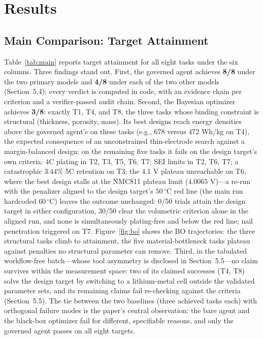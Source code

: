 \section{Results}
\label{sec:results}

\subsection{Main Comparison: Target Attainment}

Table~\ref{tab:main} reports target attainment for all eight tasks under
the six columns. Three findings stand out. First, the governed
agent achieves \textbf{8/8} under the two primary models and \textbf{4/8}
under each of the two other models (Section~5.4); every verdict is
computed in code, with an evidence chain per criterion and a verifier-passed
audit chain. Second,
the Bayesian optimizer achieves \textbf{3/8}: exactly T1, T4, and T8, the
three tasks whose binding constraint is structural (thickness, porosity,
mass). Its best designs reach energy densities above the governed agent's on
these tasks (e.g., 678 versus 472 Wh/kg on T4), the expected consequence of
an unconstrained thin-electrode search against a margin-balanced design; on
the remaining five tasks it fails on the design target's own criteria: 4C
plating in T2, T3, T5, T6, T7; SEI limits in T2, T6, T7; a catastrophic
$3.44\%$ 5C retention on T3; the 4.1 V plateau unreachable on T6, where
the best design stalls at the NMC811 plateau limit ($4.0065$ V)---a re-run
with the penalizer aligned to the design target's $50\,^\circ$C red line (the
main run hardcoded $60\,^\circ$C) leaves the outcome unchanged: 0/50 trials
attain the design target in either configuration, 30/50 clear the volumetric
criterion alone in the aligned run, and none is simultaneously
plating-free and below the red line; nail penetration triggered on T7. Figure~\ref{fig:bo} shows the BO trajectories: the three structural
tasks climb to attainment, the five material-bottleneck tasks plateau
against penalties no structural parameter can remove. Third, in the tabulated
workflow-free batch---whose tool asymmetry is disclosed in Section~5.5---no
claim survives within the
measurement space: two of its claimed successes (T4, T8) solve the design target
by switching to a lithium-metal cell outside the validated parameter sets,
and its remaining claims fail re-checking against the criteria (Section~5.5). The
tie between the two baselines (three achieved tasks each) with orthogonal
failure modes is the paper's central observation: the bare agent and the
black-box optimizer fail for different, specifiable reasons, and only the
governed agent passes on all eight targets.

